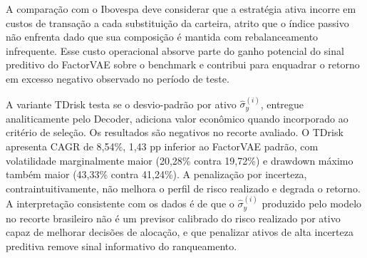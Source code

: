 A comparação com o Ibovespa deve considerar que a estratégia ativa incorre em custos de transação a cada substituição da carteira, atrito que o índice passivo não enfrenta dado que sua composição é mantida com rebalanceamento infrequente. Esse custo operacional absorve parte do ganho potencial do sinal preditivo do FactorVAE sobre o benchmark e contribui para enquadrar o retorno em excesso negativo observado no período de teste.

A variante TDrisk testa se o desvio-padrão por ativo $\hat{\sigma}_y^{(i)}$, entregue analiticamente pelo Decoder, adiciona valor econômico quando incorporado ao critério de seleção. Os resultados são negativos no recorte avaliado. O TDrisk apresenta CAGR de 8{,}54\%, 1{,}43 pp inferior ao FactorVAE padrão, com volatilidade marginalmente maior (20{,}28\% contra 19{,}72\%) e drawdown máximo também maior (43{,}33\% contra 41{,}24\%). A penalização por incerteza, contraintuitivamente, não melhora o perfil de risco realizado e degrada o retorno. A interpretação consistente com os dados é de que o $\hat{\sigma}_y^{(i)}$ produzido pelo modelo no recorte brasileiro não é um previsor calibrado do risco realizado por ativo capaz de melhorar decisões de alocação, e que penalizar ativos de alta incerteza preditiva remove sinal informativo do ranqueamento.